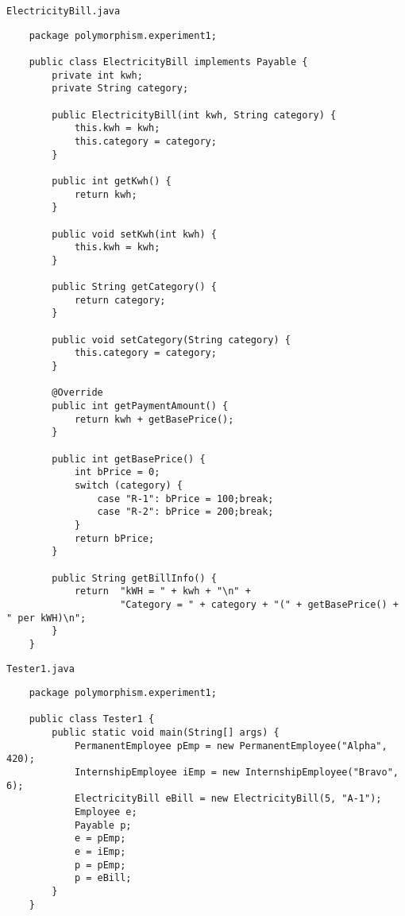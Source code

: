 \documentclass[12pt,titlepage]{article}
\begin{document}
\texttt{ElectricityBill.java}
\begin{verbatim}
    package polymorphism.experiment1;

    public class ElectricityBill implements Payable {
        private int kwh;
        private String category;

        public ElectricityBill(int kwh, String category) {
            this.kwh = kwh;
            this.category = category;
        }

        public int getKwh() {
            return kwh;
        }

        public void setKwh(int kwh) {
            this.kwh = kwh;
        }

        public String getCategory() {
            return category;
        }

        public void setCategory(String category) {
            this.category = category;
        }

        @Override
        public int getPaymentAmount() {
            return kwh + getBasePrice();
        }

        public int getBasePrice() {
            int bPrice = 0;
            switch (category) {
                case "R-1": bPrice = 100;break;
                case "R-2": bPrice = 200;break;
            }
            return bPrice;
        }

        public String getBillInfo() {
            return  "kWH = " + kwh + "\n" +
                    "Category = " + category + "(" + getBasePrice() + " per kWH)\n";
        }
    }
\end{verbatim}

\texttt{Tester1.java}
\begin{verbatim}
    package polymorphism.experiment1;

    public class Tester1 {
        public static void main(String[] args) {
            PermanentEmployee pEmp = new PermanentEmployee("Alpha", 420);
            InternshipEmployee iEmp = new InternshipEmployee("Bravo", 6);
            ElectricityBill eBill = new ElectricityBill(5, "A-1");
            Employee e;
            Payable p;
            e = pEmp;
            e = iEmp;
            p = pEmp;
            p = eBill;
        }
    }
\end{verbatim}
\end{document}

